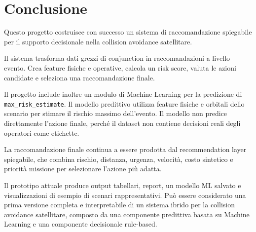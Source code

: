 \documentclass[12pt,a4paper]{article}
\begin{document}
\section{Conclusione}

Questo progetto costruisce con successo un sistema di raccomandazione spiegabile per il supporto decisionale nella collision avoidance satellitare.

Il sistema trasforma dati grezzi di conjunction in raccomandazioni a livello evento. Crea feature fisiche e operative, calcola un risk score, valuta le azioni candidate e seleziona una raccomandazione finale.

Il progetto include inoltre un modulo di Machine Learning per la predizione di \texttt{max\_risk\_estimate}. Il modello predittivo utilizza feature fisiche e orbitali dello scenario per stimare il rischio massimo dell'evento. Il modello non predice direttamente l'azione finale, perché il dataset non contiene decisioni reali degli operatori come etichette.

La raccomandazione finale continua a essere prodotta dal recommendation layer spiegabile, che combina rischio, distanza, urgenza, velocità, costo sintetico e priorità missione per selezionare l'azione più adatta.

Il prototipo attuale produce output tabellari, report, un modello ML salvato e visualizzazioni di esempio di scenari rappresentativi. Può essere considerato una prima versione completa e interpretabile di un sistema ibrido per la collision avoidance satellitare, composto da una componente predittiva basata su Machine Learning e una componente decisionale rule-based.
\end{document}
